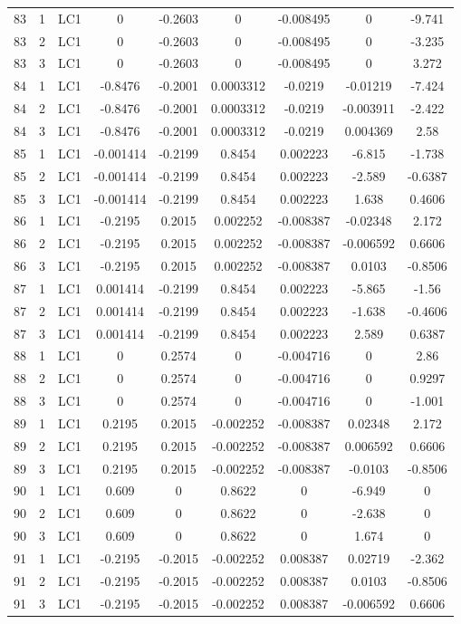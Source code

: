 \documentclass{article}%
\begin{document}
\begin{longtable}{| c c c | c c c c c c |}
83&1&LC1&0&{-}0.2603&0&{-}0.008495&0&{-}9.741\\%
83&2&LC1&0&{-}0.2603&0&{-}0.008495&0&{-}3.235\\%
83&3&LC1&0&{-}0.2603&0&{-}0.008495&0&3.272\\%
84&1&LC1&{-}0.8476&{-}0.2001&0.0003312&{-}0.0219&{-}0.01219&{-}7.424\\%
84&2&LC1&{-}0.8476&{-}0.2001&0.0003312&{-}0.0219&{-}0.003911&{-}2.422\\%
84&3&LC1&{-}0.8476&{-}0.2001&0.0003312&{-}0.0219&0.004369&2.58\\%
85&1&LC1&{-}0.001414&{-}0.2199&0.8454&0.002223&{-}6.815&{-}1.738\\%
85&2&LC1&{-}0.001414&{-}0.2199&0.8454&0.002223&{-}2.589&{-}0.6387\\%
85&3&LC1&{-}0.001414&{-}0.2199&0.8454&0.002223&1.638&0.4606\\%
86&1&LC1&{-}0.2195&0.2015&0.002252&{-}0.008387&{-}0.02348&2.172\\%
86&2&LC1&{-}0.2195&0.2015&0.002252&{-}0.008387&{-}0.006592&0.6606\\%
86&3&LC1&{-}0.2195&0.2015&0.002252&{-}0.008387&0.0103&{-}0.8506\\%
87&1&LC1&0.001414&{-}0.2199&0.8454&0.002223&{-}5.865&{-}1.56\\%
87&2&LC1&0.001414&{-}0.2199&0.8454&0.002223&{-}1.638&{-}0.4606\\%
87&3&LC1&0.001414&{-}0.2199&0.8454&0.002223&2.589&0.6387\\%
88&1&LC1&0&0.2574&0&{-}0.004716&0&2.86\\%
88&2&LC1&0&0.2574&0&{-}0.004716&0&0.9297\\%
88&3&LC1&0&0.2574&0&{-}0.004716&0&{-}1.001\\%
89&1&LC1&0.2195&0.2015&{-}0.002252&{-}0.008387&0.02348&2.172\\%
89&2&LC1&0.2195&0.2015&{-}0.002252&{-}0.008387&0.006592&0.6606\\%
89&3&LC1&0.2195&0.2015&{-}0.002252&{-}0.008387&{-}0.0103&{-}0.8506\\%
90&1&LC1&0.609&0&0.8622&0&{-}6.949&0\\%
90&2&LC1&0.609&0&0.8622&0&{-}2.638&0\\%
90&3&LC1&0.609&0&0.8622&0&1.674&0\\%
91&1&LC1&{-}0.2195&{-}0.2015&{-}0.002252&0.008387&0.02719&{-}2.362\\%
91&2&LC1&{-}0.2195&{-}0.2015&{-}0.002252&0.008387&0.0103&{-}0.8506\\%
91&3&LC1&{-}0.2195&{-}0.2015&{-}0.002252&0.008387&{-}0.006592&0.6606\\%

\end{longtable}
\end{document}

